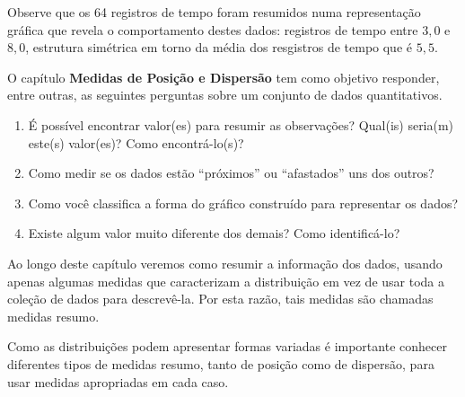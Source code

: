 Observe que os 64 registros de tempo foram resumidos numa representação gráfica que revela o comportamento destes dados: registros de tempo entre $3{,}0$ e $8{,}0$, estrutura simétrica em torno da média dos resgistros de tempo que é $5{,}5$.

O capítulo \textbf{Medidas de Posição e Dispersão} tem como objetivo responder, entre outras, as seguintes perguntas sobre um conjunto de dados quantitativos.
\begin{enumerate}
\item {} 
É possível encontrar valor(es) para resumir as observações? Qual(is) seria(m) este(s) valor(es)? Como encontrá-lo(s)?

\item {} 
Como medir se os dados estão “próximos”{} ou “afastados”{} uns dos outros?

\item {} 
Como você classifica a forma do gráfico construído para representar os dados?

\item {} 
Existe algum valor muito diferente dos demais? Como identificá-lo?

\end{enumerate}

Ao longo deste capítulo veremos como resumir a informação dos dados, usando apenas algumas medidas que caracterizam a distribuição em vez de usar toda a coleção de dados para descrevê-la. Por esta razão, tais medidas são chamadas medidas resumo.

Como as distribuições podem apresentar formas variadas é importante conhecer diferentes tipos de medidas resumo, tanto de posição como de dispersão, para usar medidas apropriadas em cada caso.

\clearpage

